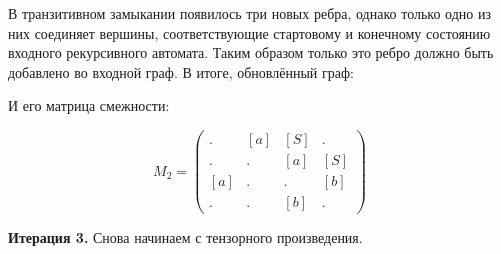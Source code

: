 \begin{example}
В транзитивном замыкании появилось три новых ребра, однако только одно из них соединяет вершины, соответствующие стартовому и конечному состоянию входного рекурсивного автомата.
Таким образом только это ребро должно быть добавлено во входной граф.
В итоге, обновлённый граф:
\begin{pic}
\begin{center}
\end{center}
\end{pic}

И его матрица смежности:

$$ M_2 =
\begin{pmatrix} 
. & [a] & [S] & . \\
. & . & [a] & [S] \\
[a] & . & . & [b] \\
. & . & [b] & . 
\end{pmatrix}
$$

\textbf{Итерация 3.}
Снова начинаем с тензорного произведения.


\end{example}
